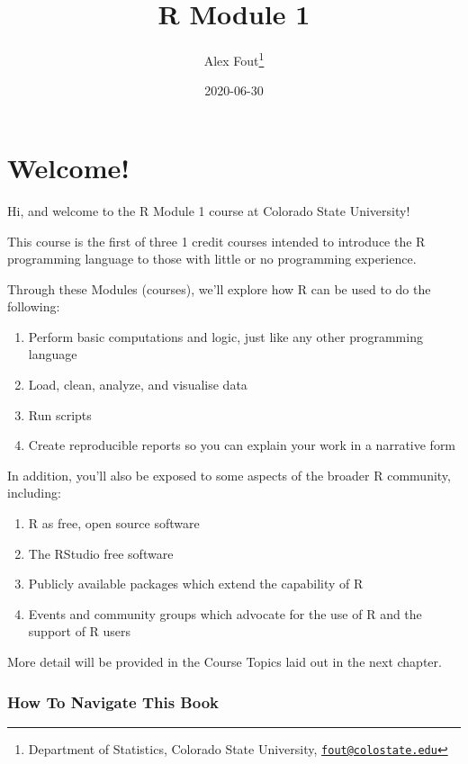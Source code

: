 \documentclass[
]{book}
\title{R Module 1}
\author{Alex Fout\footnote{Department of Statistics, Colorado State University, \href{mailto:fout@colostate.edu}{\nolinkurl{fout@colostate.edu}}}}
\date{2020-06-30}
\providecommand{\tightlist}{%
  \setlength{\itemsep}{0pt}\setlength{\parskip}{0pt}}
\begin{document}
\maketitle

{
\setcounter{tocdepth}{1}
\tableofcontents
}
\hypertarget{welcome}{%
\chapter{Welcome!}\label{welcome}}

Hi, and welcome to the R Module 1 course at Colorado State University!

This course is the first of three 1 credit courses intended to introduce the R programming language to those with little or no programming experience.

Through these Modules (courses), we'll explore how R can be used to do the following:

\begin{enumerate}
\def\labelenumi{\arabic{enumi}.}
\tightlist
\item
  Perform basic computations and logic, just like any other programming language
\item
  Load, clean, analyze, and visualise data
\item
  Run scripts
\item
  Create reproducible reports so you can explain your work in a narrative form
\end{enumerate}

In addition, you'll also be exposed to some aspects of the broader R community, including:

\begin{enumerate}
\def\labelenumi{\arabic{enumi}.}
\tightlist
\item
  R as free, open source software
\item
  The RStudio free software
\item
  Publicly available packages which extend the capability of R
\item
  Events and community groups which advocate for the use of R and the support of R users
\end{enumerate}

More detail will be provided in the Course Topics laid out in the next chapter.

\hypertarget{how-to-navigate-this-book}{%
\subsection{How To Navigate This Book}\label{how-to-navigate-this-book}}
\end{document}
